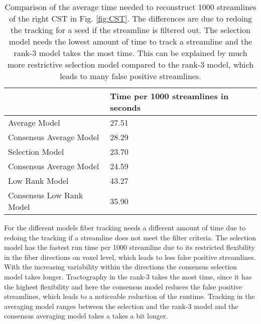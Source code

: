 \begin{table}
\centering
\begin{tabular}{p{4cm}p{3cm}}
	{}  & Time per 1000 streamlines in seconds\\ \hline  
	Average Model & 27.51\\
	Consensus Average Model & 28.29\\
	Selection Model & 23.70\\
	Consensus Average Model & 24.59 \\
	Low Rank Model &  43.27\\
	Consensus Low Rank Model & 35.90\\


\end{tabular}

\caption{Comparison of the average time needed to reconstruct 1000 streamlines of
	the right CST in Fig. \ref{fig:CST}. The differences are due to
	redoing the tracking for a seed if the streamline is filtered out. The
	selection model needs the lowest amount of time to track a streamline
	and the rank-$3$ model takes the most time. This can be explained by much
	more restrictive selection model compared to the rank-$3$ model, which
leads to many false positive streamlines.}

\end{table}

For the different models fiber tracking needs a different amount of time due to
redoing the tracking if a streamline does not meet the filter criteria. The
selection model has the fastest run time per 1000 streamline due to its restricted
flexibility in the fiber directions on voxel level, which leads to less false
positive streamlines. With the increasing
variability within the directions the consensus selection model takes 
longer. Tractography in the rank-$3$ takes the most time, since it has the
highest flexibility and here the consensus model reduces the false positive
streamlines, which leads to a noticeable reduction of the runtime.  
Tracking in the averaging model ranges between the selection and the rank-$3$
model and the consensus averaging model takes a takes a bit longer.  

